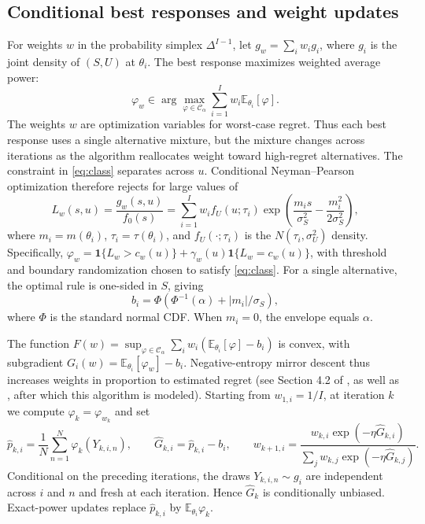 \documentclass[11pt]{article}
\newcommand{\E}{\mathbb{E}}
\newcommand{\CS}{\mathcal{C}_{\alpha}}
\begin{document}
\subsection{Conditional best responses and weight updates}

For weights $w$ in the probability simplex $\Delta^{I-1}$, let $g_w=\sum_iw_i g_i$, where $g_i$ is the joint density of $(S,U)$ at $\theta_i$. The best response maximizes weighted average power:
\begin{equation}\label{eq:bestresponse} \varphi_w\in\arg\max_{\varphi\in\CS}\sum_{i=1}^I w_i\E_{\theta_i}[\varphi]. \end{equation}
The weights $w$ are optimization variables for worst-case regret. Thus each best response uses a single alternative mixture, but the mixture changes across iterations as the algorithm reallocates weight toward high-regret alternatives. The constraint in \eqref{eq:class} separates across $u$. Conditional Neyman--Pearson optimization therefore rejects for large values of
\begin{equation}\label{eq:ratio} L_w(s,u)=\frac{g_w(s,u)}{f_0(s)}=\sum_{i=1}^I w_i f_U(u;\tau_i)\exp\!\left(\frac{m_i s}{\sigma_S^2}-\frac{m_i^2}{2\sigma_S^2}\right), \end{equation}
where $m_i=m(\theta_i)$, $\tau_i=\tau(\theta_i)$, and $f_U(\cdot;\tau_i)$ is the $N(\tau_i,\sigma_U^2)$ density. Specifically, $\varphi_w=\mathbf1\{L_w>c_w(u)\}+\gamma_w(u)\mathbf1\{L_w=c_w(u)\}$, with threshold and boundary randomization chosen to satisfy \eqref{eq:class}. For a single alternative, the optimal rule is one-sided in $S$, giving
\begin{equation}\label{eq:envelope} b_i=\Phi\!\left(\Phi^{-1}(\alpha)+|m_i|/\sigma_S\right), \end{equation}
where $\Phi$ is the standard normal CDF. When $m_i=0$, the envelope equals $\alpha$.

The function $F(w)=\sup_{\varphi\in\CS}\sum_iw_i(\E_{\theta_i}[\varphi]-b_i)$ is convex, with subgradient $G_i(w)=\E_{\theta_i}[\varphi_w]-b_i$. Negative-entropy mirror descent thus increases weights in proportion to estimated regret (see Section 4.2 of \cite{bubeck2015convex}, as well as \cite{freund1999adaptive}, after which this algorithm is modeled). Starting from $w_{1,i}=1/I$, at iteration $k$ we compute $\varphi_k=\varphi_{w_k}$ and set
\begin{equation}\label{eq:update} \widehat p_{k,i}=\frac1N\sum_{n=1}^N\varphi_k(Y_{k,i,n}),\qquad \widehat G_{k,i}=\widehat p_{k,i}-b_i,\qquad w_{k+1,i}=\frac{w_{k,i}\exp(-\eta\widehat G_{k,i})}{\sum_jw_{k,j}\exp(-\eta\widehat G_{k,j})}. \end{equation}
Conditional on the preceding iterations, the draws $Y_{k,i,n}\sim g_i$ are independent across $i$ and $n$ and fresh at each iteration. Hence $\widehat G_k$ is conditionally unbiased. Exact-power updates replace $\widehat p_{k,i}$ by $\E_{\theta_i}\varphi_k$.
\end{document}

